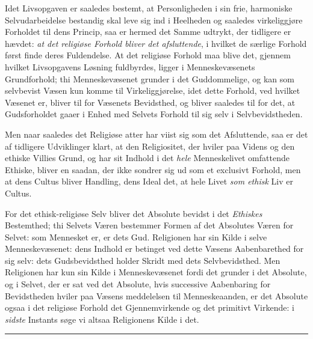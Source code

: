 Idet Livsopgaven er saaledes bestemt, at Personligheden i sin frie, harmoniske
Selvudarbeidelse bestandig skal leve sig ind i Heelheden og saaledes
virkeliggjøre Forholdet til dens Princip, saa er hermed det Samme udtrykt, der
tidligere er hævdet: \emph{at det religiøse Forhold bliver det afsluttende}, i
hvilket de særlige Forhold først finde deres Fuldendelse. At det religiøse
Forhold maa blive det, gjennem hvilket Livsopgavens Løsning fuldbyrdes, ligger
i Menneskevæsenets Grundforhold; thi Menneskevæsenet grunder i det
Guddommelige, og kan som selvbevist Væsen kun komme til Virkeliggjørelse, idet
dette Forhold, ved hvilket Væsenet er, bliver til for Væsenets Bevidsthed, og
bliver saaledes til for det, at Gudsforholdet gaaer i Enhed med Selvets Forhold
til sig selv i Selvbevidstheden.

Men naar saaledes det Religiøse atter har viist sig som det Afsluttende, saa er
det af tidligere Udviklinger klart, at den Religiositet, der hviler paa Videns
og den ethiske Villies Grund, og har sit Indhold i det \emph{hele}
Menneskelivet omfattende Ethiske, bliver en saadan, der ikke sondrer sig ud som
et exclusivt Forhold, men at dens Cultus bliver Handling, dens Ideal det, at
hele Livet \emph{som ethisk} Liv er Cultus.

For det ethisk-religiøse Selv bliver det Absolute bevidst i det
\emph{Ethiskes} Bestemthed; thi Selvets Væren bestemmer Formen af det Absolutes
Væren for Selvet: som Mennesket er, er dets Gud. Religionen har sin Kilde i
selve Menneskevæsenet: dens Indhold er betinget ved dette Væsens Aabenbarethed
for sig selv: dets Gudsbevidsthed holder Skridt med dets Selvbevidsthed. Men
Religionen har kun sin Kilde i Menneskevæsenet fordi det grunder i det
Absolute, og i Selvet, der er sat ved det Absolute, hvis successive Aabenbaring
for Bevidstheden hviler paa Væsens\-%
\setcounter{footnote}{0}%
meddelelsen til Menneskeaanden, er det Absolute ogsaa i det religiøse Forhold
det Gjennemvirkende og det primitivt Virkende: i \emph{sidste} Instants søge vi
altsaa Religionens Kilde i det.

\begin{center}\rule{2cm}{0.4pt}\end{center}

